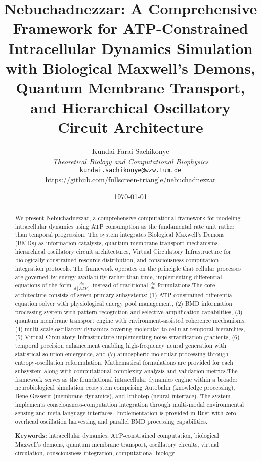 \documentclass[12pt,a4paper]{article}
\title{\textbf{Nebuchadnezzar: A Comprehensive Framework for ATP-Constrained Intracellular Dynamics Simulation with Biological Maxwell's Demons, Quantum Membrane Transport, and Hierarchical Oscillatory Circuit Architecture}}
\author{
Kundai Farai Sachikonye\\
\textit{Theoretical Biology and Computational Biophysics}\\
\texttt{kundai.sachikonye@wzw.tum.de}\\
\url{https://github.com/fullscreen-triangle/nebuchadnezzar}
}
\date{\today}
\begin{document}
\maketitle

\begin{abstract}
We present Nebuchadnezzar, a comprehensive computational framework for modeling intracellular dynamics using ATP consumption as the fundamental rate unit rather than temporal progression. The system integrates Biological Maxwell's Demons (BMDs) as information catalysts, quantum membrane transport mechanisms, hierarchical oscillatory circuit architectures, Virtual Circulatory Infrastructure for biologically-constrained resource distribution, and consciousness-computation integration protocols. The framework operates on the principle that cellular processes are governed by energy availability rather than time, implementing differential equations of the form $\frac{dx}{d[ATP]}$ instead of traditional $\frac{dx}{dt}$ formulations.The core architecture consists of seven primary subsystems: (1) ATP-constrained differential equation solver with physiological energy pool management, (2) BMD information processing system with pattern recognition and selective amplification capabilities, (3) quantum membrane transport engine with environment-assisted coherence mechanisms, (4) multi-scale oscillatory dynamics covering molecular to cellular temporal hierarchies, (5) Virtual Circulatory Infrastructure implementing noise stratification gradients, (6) temporal precision enhancement enabling high-frequency neural generation with statistical solution emergence, and (7) atmospheric molecular processing through entropy-oscillation reformulation. Mathematical formulations are provided for each subsystem along with computational complexity analysis and validation metrics.The framework serves as the foundational intracellular dynamics engine within a broader neurobiological simulation ecosystem comprising Autobahn (knowledge processing), Bene Gesserit (membrane dynamics), and Imhotep (neural interface). The system implements consciousness-computation integration through multi-modal environmental sensing and meta-language interfaces. Implementation is provided in Rust with zero-overhead oscillation harvesting and parallel BMD processing capabilities.

\textbf{Keywords:} intracellular dynamics, ATP-constrained computation, biological Maxwell's demons, quantum membrane transport, oscillatory circuits, virtual circulation, consciousness integration, computational biology
\end{abstract}
\end{document}
